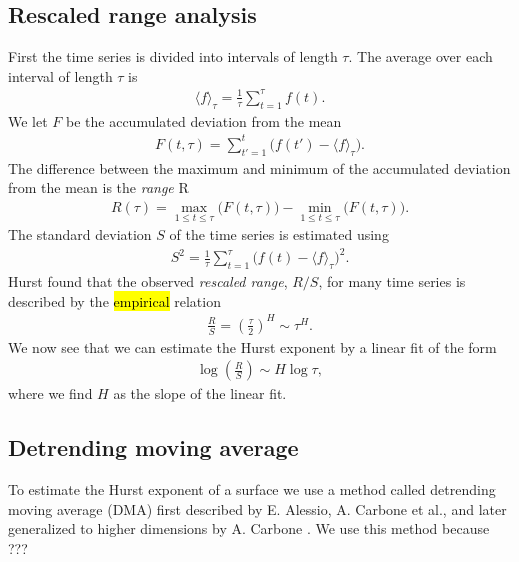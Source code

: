 \subsection{Rescaled range analysis}
First the time series is divided into  intervals of length $\tau$. The average over each interval of length $\tau$ is
\begin{align*}
    \langle f \rangle_\tau = \frac{1}{\tau} \sum_{t=1}^\tau f(t).
\end{align*}
We let $F$ be the accumulated deviation from the mean
\begin{align*}
    F(t, \tau) = \sum_{t' = 1}^t \big( f(t') - \langle f \rangle_\tau \big).
\end{align*}
The difference between the maximum and minimum of the accumulated deviation from the mean is the \emph{range} R
\begin{align*}
    R(\tau) = \max_{1 \leq t \leq \tau} \big(F(t,\tau)\big) - \min_{1 \leq t \leq \tau} \big(F(t, \tau)\big).
\end{align*}
The standard deviation $S$ of the time series is estimated using
\begin{align*}
    S^2 = \frac{1}{\tau} \sum_{t=1}^\tau \big( f(t) - \langle f \rangle_\tau \big)^2.
\end{align*}
Hurst found that the observed \emph{rescaled range}, $R/S$, for many time series is described by the \hl{empirical} relation\cite{feder1988fractals}
\begin{align*}
    \frac{R}{S} = \left(\frac{\tau}{2}\right)^H \sim \tau^H.
\end{align*}
We now see that we can estimate the Hurst exponent by a linear fit of the form
\begin{align*}
    \log \left(\frac{R}{S}\right) \sim H\log\tau,
\end{align*}
where we find $H$ as the slope of the linear fit.


\subsection{Detrending moving average}
To estimate the Hurst exponent of a surface we use a method called detrending moving average (DMA) first described by E. Alessio, A. Carbone et al.\cite{alessio2002dma}, and later generalized to higher dimensions by A. Carbone \cite{carbone2007algorithm}. We use this method because ??? 

